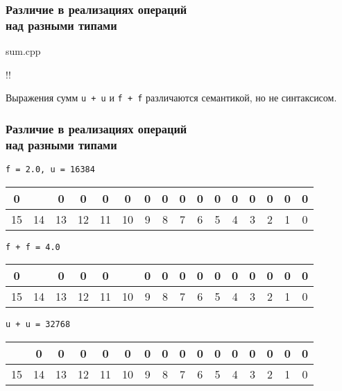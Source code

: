 \documentclass[compress, 8pt]{beamer}
\newenvironment{sixteenbit}{%
    \begin{center}
        \begin{tabular}{ |c|c|c|c|c|c|c|c|c|c|c|c|c|c|c|c|  }
            \hline
}{
        \hline
        \multicolumn{1}{c}{\color{gray}\tiny{15}} &
        \multicolumn{1}{c}{\color{gray}\tiny{14}} &
        \multicolumn{1}{c}{\color{gray}\tiny{13}} &
        \multicolumn{1}{c}{\color{gray}\tiny{12}} &
        \multicolumn{1}{c}{\color{gray}\tiny{11}} &
        \multicolumn{1}{c}{\color{gray}\tiny{10}} &
        \multicolumn{1}{c}{\color{gray}\tiny{9}} &
        \multicolumn{1}{c}{\color{gray}\tiny{8}} &
        \multicolumn{1}{c}{\color{gray}\tiny{7}} &
        \multicolumn{1}{c}{\color{gray}\tiny{6}} &
        \multicolumn{1}{c}{\color{gray}\tiny{5}} &
        \multicolumn{1}{c}{\color{gray}\tiny{4}} &
        \multicolumn{1}{c}{\color{gray}\tiny{3}} &
        \multicolumn{1}{c}{\color{gray}\tiny{2}} &
        \multicolumn{1}{c}{\color{gray}\tiny{1}} &
        \multicolumn{1}{c}{\color{gray}\tiny{0}} \\
        \end{tabular}
    \end{center}
}
\begin{document}
\begin{frame}[fragile]

    \frametitle{Различие в реализациях операций \\ над разными типами}

        {sum.cpp}

    \begin{terminalwindow}
!!
    \end{terminalwindow}

    Выражения сумм \verb|u + u| и \verb|f + f| различаются семантикой, но не
    синтаксисом.

\end{frame}

\begin{frame}[fragile]

    \frametitle{Различие в реализациях операций \\ над разными типами}

    \verb|f = 2.0, u = 16384|

    \begin{sixteenbit}
        0 & \cellcolor{gray}{1} & 0 & 0 & 0 & 0 & 0 & 0 & 0 & 0 & 0 & 0 & 0 & 0 & 0 & 0 \\
    \end{sixteenbit}

    \verb|f + f = 4.0|

    \begin{sixteenbit}
        0 & \cellcolor{gray}{1} & 0 & 0 & 0 & \cellcolor{gray}{1} & 0 & 0 & 0 & 0 & 0 & 0 & 0 & 0 & 0 & 0 \\
    \end{sixteenbit}

    \verb|u + u = 32768|

    \begin{sixteenbit}
        \cellcolor{gray}{1} & 0 & 0 & 0 & 0 & 0 & 0 & 0 & 0 & 0 & 0 & 0 & 0 & 0 & 0 & 0 \\
    \end{sixteenbit}

\end{frame}
\end{document}
